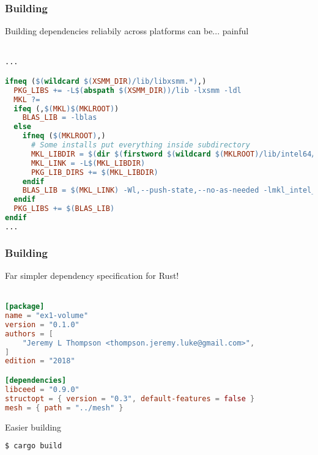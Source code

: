 \documentclass{beamer}
\begin{document}
\begin{frame}[fragile]
\begin{center}
\frametitle{Building}

Building dependencies reliabily across platforms can be... painful\\

~\\

{\scriptsize
\begin{lstlisting}[language=makefile, style=boxedMakefile]
...

ifneq ($(wildcard $(XSMM_DIR)/lib/libxsmm.*),)
  PKG_LIBS += -L$(abspath $(XSMM_DIR))/lib -lxsmm -ldl
  MKL ?=
  ifeq (,$(MKL)$(MKLROOT))
    BLAS_LIB = -lblas
  else
    ifneq ($(MKLROOT),)
      # Some installs put everything inside subdirectory
      MKL_LIBDIR = $(dir $(firstword $(wildcard $(MKLROOT)/lib/intel64/libmkl_sequential.* $(MKLROOT)/lib/libmkl_sequential.*)))
      MKL_LINK = -L$(MKL_LIBDIR)
      PKG_LIB_DIRS += $(MKL_LIBDIR)
    endif
    BLAS_LIB = $(MKL_LINK) -Wl,--push-state,--no-as-needed -lmkl_intel_lp64 -lmkl_sequential -lmkl_core -lpthread -lm -ldl -Wl,--pop-state
  endif
  PKG_LIBS += $(BLAS_LIB)
endif
...
\end{lstlisting}
}

\end{center}
\end{frame}


\begin{frame}[fragile]
\begin{center}
\frametitle{Building}

Far simpler dependency specification for Rust!\\

~\\

{\footnotesize
\begin{lstlisting}[language=TOML, style=boxedTOML]
[package]
name = "ex1-volume"
version = "0.1.0"
authors = [
    "Jeremy L Thompson <thompson.jeremy.luke@gmail.com>",
]
edition = "2018"

[dependencies]
libceed = "0.9.0"
structopt = { version = "0.3", default-features = false }
mesh = { path = "../mesh" }
\end{lstlisting}
}

Easier building

{\footnotesize
\begin{lstlisting}[language=sh, style=boxedSH]
$ cargo build
\end{lstlisting}
}

\end{center}
\end{frame}
\end{document}
